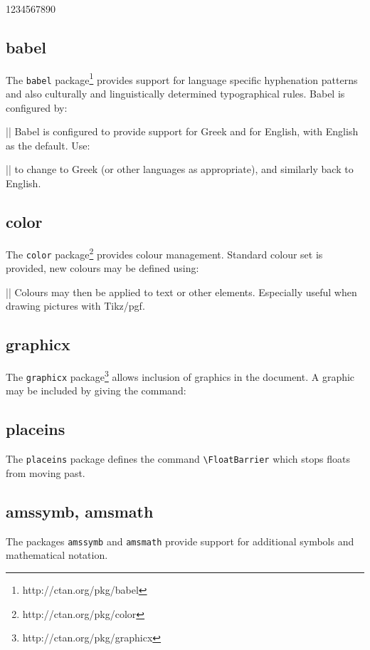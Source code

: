 \documentclass[electronic,timesopt,headers]{adharticle} %
\begin{document}
1234567890

\subsection{babel}

The \texttt{babel} package\footnote{http://ctan.org/pkg/babel} provides support
for language specific hyphenation patterns and also culturally and
linguistically determined typographical rules. Babel is configured by:

\latex||
Babel is configured to provide support for Greek and for English, with English
as the default. Use:

\latex||
to change to Greek (or other languages as appropriate), and similarly back to
English.

\subsection{color}

The \texttt{color} package\footnote{http://ctan.org/pkg/color} provides colour
management. Standard colour set is provided, new colours may be defined using:

\latex||
Colours may then be applied to text or other elements. Especially useful when
drawing pictures with Tikz/pgf.

\subsection{graphicx}

The \texttt{graphicx} package\footnote{http://ctan.org/pkg/graphicx} allows
inclusion of graphics in the document. A graphic may be included by giving the
command:

\subsection{placeins}

The \texttt{placeins} package defines the command
\texttt{\textbackslash{}FloatBarrier} which stops floats from moving past.

\subsection{amssymb, amsmath}

The packages \texttt{amssymb} and \texttt{amsmath} provide support for
additional symbols and mathematical notation.
\end{document}
